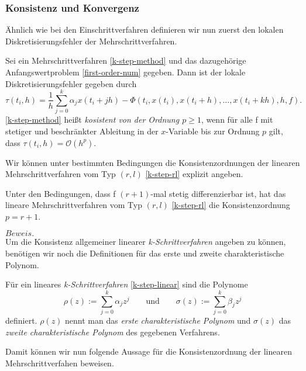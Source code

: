 \subsubsection{Konsistenz und Konvergenz}
Ähnlich wie bei den Einschrittverfahren definieren wir nun zuerst den lokalen Diskretisierungsfehler der
Mehrschrittverfahren.
\begin{definition}
    Sei ein Mehrschrittverfahren \eqref{k-step-method} und das dazugehörige Anfangswertproblem \eqref{first-order-num}
    gegeben. Dann ist der lokale Diskretisierungsfehler gegeben durch
    \[
        \tau(t_i,h) = \frac{1}{h} \sum_{j=0}^{k} \alpha_j x(t_i + jh) -
        \Phi (t_i,x(t_i), x(t_i+h), \dots, x(t_i+kh),h,f).
    \]
    \eqref{k-step-method} heißt \textit{kosistent von der Ordnung $p\geq 1$}, wenn für alle f mit stetiger und
    beschränkter Ableitung in der $x$-Variable bis zur Ordnung $p$ gilt, dass $\tau(t_i,h) = \mathcal{O}(h^p)$.
\end{definition}
Wir können unter bestimmten Bedingungen die Konsistenzordnungen der linearen Mehrschrittverfahren vom Typ $(r,l)$
\eqref{k-step-rl} explizit angeben.
\begin{satz}
    Unter den Bedingungen, dass f $(r+1)$-mal stetig differenzierbar ist, hat das lineare Mehrschrittverfahren vom Typ
    $(r,l)$ \eqref{k-step-rl} die Konsistenzordnung $p=r+1$.
\end{satz}
$Beweis.$ \cite[93,94]{stykelSkriptZurVorlesung2020}\\
Um die Konsistenz allgemeiner linearer \textit{k-Schrittverfahren} angeben zu können, benötigen wir noch die
Definitionen für das erste und zweite charakteristische Polynom.
\begin{definition}
    Für ein lineares \textit{k-Schrittverfahren} \eqref{k-step-linear} sind die Polynome
    \[
        \rho(z) := \sum_{j=0}^{k} \alpha_j z^j \qquad \text{und} \qquad \sigma(z) := \sum_{j=0}^{k} \beta_j z^j
    \]
    definiert. $\rho(z)$ nennt man das \textit{erste charakteristische Polynom} und $\sigma(z)$ das
    \textit{zweite charakteristische Polynom} des gegebenen Verfahrens.
\end{definition}
Damit können wir nun folgende Aussage für die Konsistenzordnung der linearen Mehrschrittverfahen beweisen.
